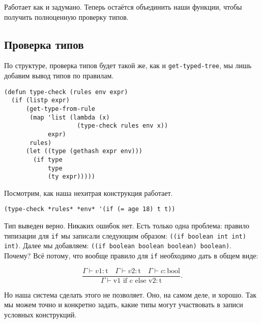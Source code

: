 \documentclass[a4paper,11pt]{article}
\begin{document}
Работает как и задумано. Теперь остаётся объединить наши функции, чтобы получить полноценную проверку типов.

\subsection{Проверка типов}
\label{sec:orgce7aa39}
По структуре, проверка типов будет такой же, как и \texttt{get-typed-tree}, мы лишь добавим вывод типов по правилам.
\begin{verbatim}
(defun type-check (rules env expr)
  (if (listp expr)
      (get-type-from-rule
       (map 'list (lambda (x)
                    (type-check rules env x))
            expr)
       rules)
      (let ((type (gethash expr env)))
        (if type
            type
            (ty expr)))))
\end{verbatim}

Посмотрим, как наша нехитрая конструкция работает.
\begin{verbatim}
(type-check *rules* *env* '(if (= age 18) t t))
\end{verbatim}

Тип выведен верно. Никаких ошибок нет. Есть только одна проблема: правило типизации для \texttt{if} мы записали следующим образом: \texttt{((if boolean int int) int)}. Далее мы добавляем: \texttt{((if boolean boolean boolean) boolean)}. Почему? Всё потому, что вообще правило для \texttt{if} необходимо дать в общем виде:

\[
\frac{\Gamma \vdash v1 : \textrm{t} \quad \Gamma \vdash v2 : \textrm{t}
\quad \Gamma \vdash c : \textrm{bool}}
{\Gamma \vdash \textrm{v1 if c else v2} : \textrm{t}}.
\]

Но наша система сделать этого не позволяет. Оно, на самом деле, и хорошо. Так мы можем точно и конкретно задать, какие типы могут участвовать в записи условных конструкций.
\end{document}
